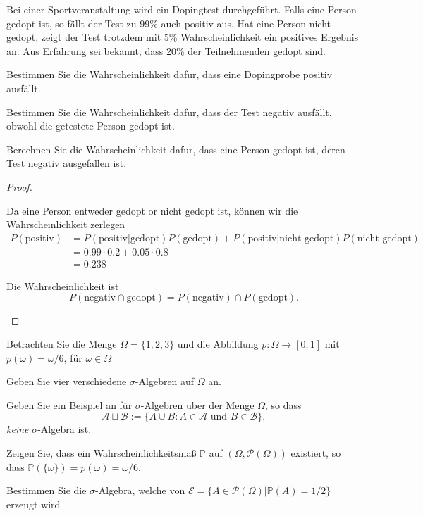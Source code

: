 \begin{Problem}
	Bei einer Sportveranstaltung wird ein Dopingtest durchgeführt. Falls eine Person gedopt ist, so fällt der Test zu 99\% auch positiv aus. Hat eine Person nicht gedopt, zeigt der Test trotzdem mit 5\% Wahrscheinlichkeit ein positives Ergebnis an. Aus Erfahrung sei bekannt, dass 20\% der Teilnehmenden gedopt sind.
	\begin{parts}
		\item Bestimmen Sie die Wahrscheinlichkeit dafur, dass eine Dopingprobe positiv ausf\"{a}llt.
		\item Bestimmen Sie die Wahrscheinlichkeit dafur, dass der Test negativ ausf\"{a}llt, obwohl die getestete Person gedopt ist.
		\item Berechnen Sie die Wahrscheinlichkeit dafur, dass eine Person gedopt ist, deren Test negativ ausgefallen ist.
	\end{parts}
\end{Problem}
\begin{proof}
	\begin{parts}
	\item Da eine Person entweder gedopt or nicht gedopt ist, können wir die Wahrscheinlichkeit zerlegen
		\begin{align*}
			P(\text{positiv})&=P(\text{positiv}|\text{gedopt})P(\text{gedopt}) + P(\text{positiv}|\text{nicht gedopt})P(\text{nicht gedopt})\\
					 &=0.99\cdot 0.2+0.05\cdot 0.8\\
					 &=0.238
		\end{align*}
	\item Die Wahrscheinlichkeit ist
		\[
			P(\text{negativ}\cap \text{gedopt})=P(\text{negativ})\cap P(\text{gedopt})
		.\] 
	\end{parts}
\end{proof}
\begin{Problem}
	Betrachten Sie die Menge $\Omega = \{1, 2, 3\}$ und die Abbildung $p : \Omega \to [0, 1]$ mit $p(\omega) = \omega/6$, f\"{u}r $\omega\in\Omega$
	\begin{parts}
		\item Geben Sie vier verschiedene $\sigma$-Algebren auf $\Omega$ an.
		\item Geben Sie ein Beispiel an f\"{u}r $\sigma$-Algebren uber der Menge $\Omega$, so dass
		\[\mathcal{A}\sqcup \mathcal{B}:=\{A\cup B:A\in\mathcal{A}\text{ und }B\in\mathcal{B}\},\]
		\emph{keine} $\sigma$-Algebra ist.
		\item Zeigen Sie, dass ein Wahrscheinlichkeitsmaß $\mathbb{P}$ auf $(\Omega,\mathcal{P}(\Omega))$ existiert, so dass $\mathbb{P}(\{\omega\}) =p(\omega)=\omega/6$.
		\item Bestimmen Sie die $\sigma$-Algebra, welche von $\mathcal{E} = \{A\in \mathcal{P}(\Omega)|\mathbb{P}(A) = 1/2\}$ erzeugt wird
	\end{parts}
	\end{Problem}
